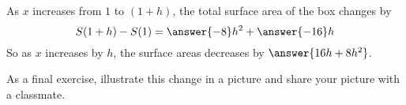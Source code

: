 \documentclass{ximera}
\begin{document}
\begin{exercise}
  As $x$ increases from $1$ to $(1+h)$, the total surface area of the
  box changes by
  \[
  S(1+h) - S(1) = \answer{-8}h^2 + \answer{-16}h
  \]
  So as $x$ increases by $h$, the surface areas decreases by
  $\answer{16h+8h^2}$.

  As a final exercise, illustrate this change in a picture and share your picture with a classmate.
  \begin{multipleChoice}
  \end{multipleChoice}
\end{exercise}
\end{document}
